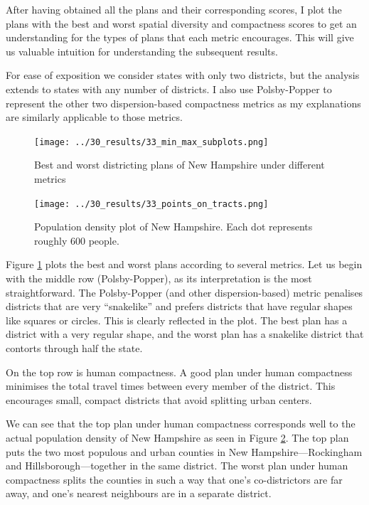 \documentclass[]{article}
\begin{document}
After having obtained all the plans and their corresponding scores, I
plot the plans with the best and worst spatial diversity and compactness
scores to get an understanding for the types of plans that each metric
encourages. This will give us valuable intuition for understanding the
subsequent results.

For ease of exposition we consider states with only two districts, but
the analysis extends to states with any number of districts. I also use
Polsby-Popper to represent the other two dispersion-based compactness
metrics as my explanations are similarly applicable to those metrics.

\begin{figure}
\centering
\texttt{[image: ../30\_results/33\_min\_max\_subplots.png]}
\caption{Best and worst districting plans of New Hampshire under
different metrics \label{nh_minmax}}
\end{figure}

\begin{figure}
\centering
\texttt{[image: ../30\_results/33\_points\_on\_tracts.png]}
\caption{Population density plot of New Hampshire. Each dot represents
roughly 600 people. \label{nh_density}}
\end{figure}

Figure \ref{nh_minmax} plots the best and worst plans according to
several metrics. Let us begin with the middle row (Polsby-Popper), as
its interpretation is the most straightforward. The Polsby-Popper (and
other dispersion-based) metric penalises districts that are very
``snakelike'' and prefers districts that have regular shapes like
squares or circles. This is clearly reflected in the plot. The best plan
has a district with a very regular shape, and the worst plan has a
snakelike district that contorts through half the state.

On the top row is human compactness. A good plan under human compactness
minimises the total travel times between every member of the district.
This encourages small, compact districts that avoid splitting urban
centers.

We can see that the top plan under human compactness corresponds well to
the actual population density of New Hampshire as seen in Figure
\ref{nh_density}. The top plan puts the two most populous and urban
counties in New Hampshire---Rockingham and Hillsborough---together in
the same district. The worst plan under human compactness splits the
counties in such a way that one's co-districtors are far away, and one's
nearest neighbours are in a separate district.
\end{document}
